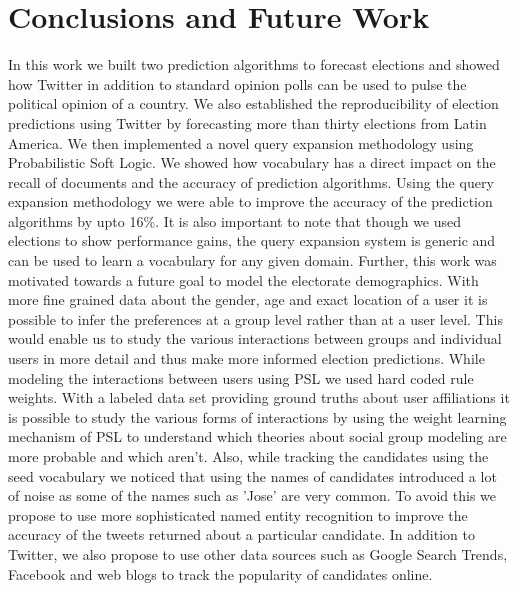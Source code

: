 \chapter{Conclusions and Future Work}
In this work we built two prediction algorithms to forecast elections and showed how Twitter in addition to standard opinion polls can be used to pulse the political opinion of a country.
We also established the reproducibility of election predictions using Twitter by forecasting more than thirty elections from Latin America.
We then implemented a novel query expansion methodology using Probabilistic Soft Logic.
We showed how vocabulary has a direct impact on the recall of documents and the accuracy of prediction algorithms.
Using the query expansion methodology we were able to improve the accuracy of the prediction algorithms by upto 16\%.  
It is also important to note that though we used elections to show performance gains, the query expansion system is generic and can be used to learn a vocabulary for any given domain.
\newline
Further, this work was motivated towards a future goal to model the electorate demographics.
With more fine grained data about the gender, age and exact location of a user it is possible to infer the preferences at a group level rather than at a user level.
This would enable us to study the various interactions between groups and individual users in more detail and thus make more informed election predictions.
\newline
While modeling the interactions between users using PSL we used hard coded rule weights. 
With a labeled data set providing ground truths about user affiliations it is possible to study the various forms of interactions by using the weight learning mechanism of PSL to understand which theories about social group modeling are more probable and which aren't.
\newline
Also, while tracking the candidates using the seed vocabulary we noticed that using the names of candidates introduced a lot of noise as some of the names such as 'Jose' are very common. 
To avoid this we propose to use more sophisticated named entity recognition to improve the accuracy of the tweets returned about a particular candidate. 
\newline
In addition to Twitter, we also propose to use other data sources such as Google Search Trends, Facebook and web blogs to track the popularity of candidates online.
